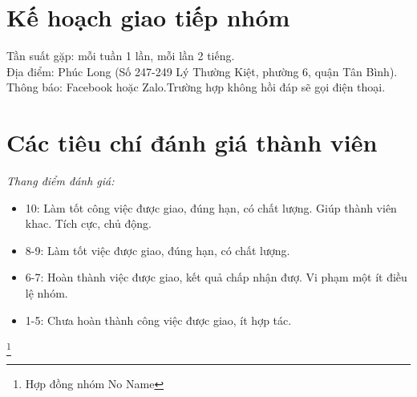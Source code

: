 \documentclass[12pt, a4paper]{article}
\begin{document}
\section{Kế hoạch giao tiếp nhóm}
   Tần suất gặp: mỗi tuần 1 lần, mỗi lần 2 tiếng.\\
   Địa điểm: Phúc Long (Số 247-249 Lý Thường Kiệt, phường 6, quận Tân Bình). \\
   Thông báo: Facebook hoặc Zalo.Trường hợp không hồi đáp sẽ gọi điện thoại.\\
\section{Các tiêu chí đánh giá thành viên}
   \textit{Thang điểm đánh giá:}
     \begin{itemize}
         \item 10: Làm tốt công việc được giao, đúng hạn, có chất lượng. Giúp thành viên khac. Tích cực, chủ động.
         \item 8-9: Làm tốt việc được giao, đúng hạn, có chất lượng.
         \item 6-7: Hoàn thành việc được giao, kết quả chấp nhận đượ. Vi phạm một ít điều lệ nhóm.
         \item 1-5: Chưa hoàn thành công việc được giao, ít hợp tác.
     \end{itemize}
\footnote{Hợp đồng nhóm No Name}
\end{document}
